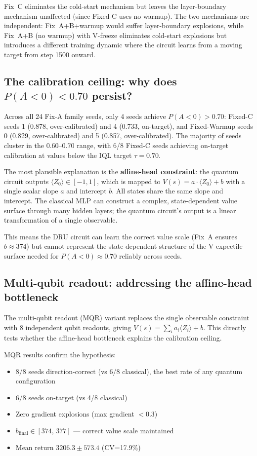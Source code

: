\documentclass[10pt,a4paper]{article}
\begin{document}
Fix~C eliminates the cold-start mechanism but leaves the layer-boundary
mechanism unaffected (since Fixed-C uses no warmup). The two mechanisms are
independent: Fix~A+B+warmup would suffer layer-boundary explosions, while
Fix~A+B (no warmup) with V-freeze eliminates cold-start explosions but
introduces a different training dynamic where the circuit learns from a moving
target from step 1500 onward.

\subsection{The calibration ceiling: why does $P(A<0)<0.70$ persist?}

Across all 24 Fix-A family seeds, only 4 seeds achieve $P(A<0)>0.70$:
Fixed-C seeds 1 (0.878, over-calibrated) and 4 (0.733, on-target), and
Fixed-Warmup seeds 0 (0.829, over-calibrated) and 5 (0.857, over-calibrated).
The majority of seeds cluster in the $0.60$--$0.70$ range, with 6/8 Fixed-C
seeds achieving on-target calibration at values below the IQL target $\tau=0.70$.

The most plausible explanation is the \textbf{affine-head constraint}: the
quantum circuit outputs $\langle Z_0\rangle\in[-1,1]$, which is mapped to
$V(s)=a\cdot\langle Z_0\rangle+b$ with a single scalar slope $a$ and intercept
$b$. All states share the same slope and intercept. The classical MLP can
construct a complex, state-dependent value surface through many hidden layers;
the quantum circuit's output is a linear transformation of a single observable.

This means the DRU circuit can learn the correct value scale (Fix~A ensures
$b\approx374$) but cannot represent the state-dependent structure of the
V-expectile surface needed for $P(A<0)\approx0.70$ reliably across seeds.

\subsection{Multi-qubit readout: addressing the affine-head bottleneck}

The multi-qubit readout (MQR) variant replaces the single observable constraint
with 8 independent qubit readouts, giving $V(s)=\sum_i a_i \langle Z_i\rangle + b$.
This directly tests whether the affine-head bottleneck explains the calibration
ceiling.

MQR results confirm the hypothesis:
\begin{itemize}
  \item 8/8 seeds direction-correct (vs 6/8 classical), the best rate of any
        quantum configuration
  \item 6/8 seeds on-target (vs 4/8 classical)
  \item Zero gradient explosions (max gradient $<0.3$)
  \item $b_\text{final}\in[374,\,377]$ — correct value scale maintained
  \item Mean return $3206.3 \pm 573.4$ (CV=17.9\%)
\end{itemize}
\end{document}
